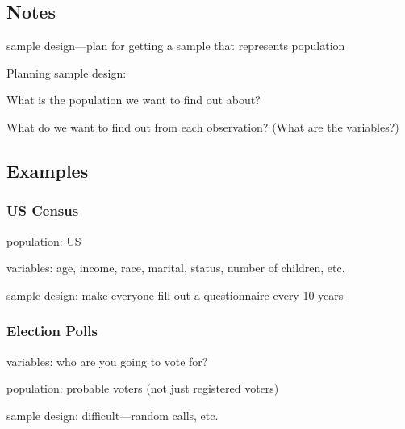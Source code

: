 \documentclass[landscape]{exam}
\begin{document}
  \subsection{Notes}

  sample design---plan for getting a sample that represents population

  Planning sample design:
  \begin{itemize*}
    \item What is the population we want to find out about? 
    \item What do we want to find out from each observation? (What are the
      variables?)
  \end{itemize*}

  \subsection{Examples}

  \subsubsection{US Census}
  \begin{itemize*}
   \item population: US
   \item variables: age, income, race, marital, status, number of children, etc.
   \item sample design: make everyone fill out a questionnaire every 10 years 
  \end{itemize*}

  \subsubsection{Election Polls}
  \begin{itemize*}
   \item variables: who are you going to vote for?
   \item population: probable voters (not just registered voters)
   \item sample design: difficult---random calls, etc.
  \end{itemize*}

\end{document}
